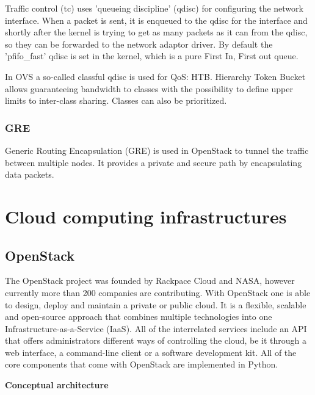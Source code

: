 Traffic control (tc) uses 'queueing discipline' (qdisc) for configuring the network interface. When a packet is sent, it is enqueued to the qdisc for the interface and shortly after the kernel is trying to get as many packets as it can from the qdisc, so they can be forwarded to the network adaptor driver. By default the 'pfifo\_fast' qdisc is set in the kernel, which is a pure First In, First out queue.

In OVS a so-called classful qdisc is used for QoS: HTB. Hierarchy Token Bucket allows guaranteeing bandwidth to classes with the possibility to define upper limits to inter-class sharing. Classes can also be prioritized.


\subsubsection{GRE}
Generic Routing Encapsulation (GRE) is used in OpenStack to tunnel the traffic between multiple nodes. It provides a private and secure path by encapsulating data packets.


\section{Cloud computing infrastructures}


\subsection{OpenStack}

The OpenStack project was founded by Rackpace Cloud and NASA, however currently more than 200 companies are contributing.
With OpenStack one is able to design, deploy and maintain a private or public cloud. It is a flexible, scalable and open-source approach that combines multiple technologies into one Infrastructure-as-a-Service (IaaS). All of the interrelated services include an API that offers administrators different ways of controlling the cloud, be it through a web interface, a command-line client or a software development kit. All of the core components that come with OpenStack are implemented in Python.


\textbf{Conceptual architecture}

